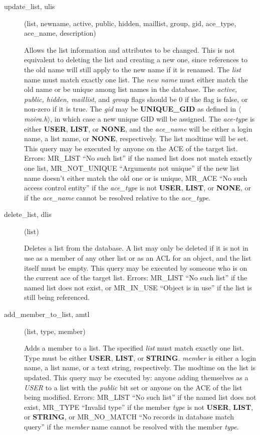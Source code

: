 \documentclass{article}
\begin{document}
\begin{description}
\item[update\_list, ulis](list, newname, active, public, hidden, maillist,
group, gid, ace\_type, ace\_name, description)

Allows the list information and attributes to be changed. This is not
equivalent to deleting the list and creating a new one, since
references to the old name will still apply to the new name if it is
renamed. The {\em list} name must match exactly one list. The {\em new
name} must either match the old name or be unique among list names in
the database. The {\em active, public, hidden, maillist}, and {\em
group} flags should be 0 if the flag is false, or non-zero if it is
true. The {\em gid} may be {\bf UNIQUE\_GID} as defined in {\em
$\langle$moira.h$\rangle$}, in which case a new unique GID will be
assigned. The {\em ace-type} is either {\bf USER}, {\bf LIST}, or {\bf
NONE}, and the {\em ace\_name} will be either a login name, a list
name, or {\bf NONE}, respectively. The list modtime will be set. This
query may be executed by anyone on the ACE of the target list. Errors:
MR\_LIST ``No such list'' if the named list does not match exactly one
list, MR\_NOT\_UNIQUE ``Arguments not unique'' if the new list name
doesn't either match the old one or is unique, MR\_ACE ``No such access
control entity'' if the {\em ace\_type} is not {\bf USER}, {\bf LIST},
or {\bf NONE}, or if the {\em ace\_name} cannot be resolved relative to
the {\em ace\_type}.

\item[delete\_list, dlis](list)

Deletes a list from the database.  A list may only be deleted if it is
not in use as a member of any other list or as an ACL for an object,
and the list itself must be empty.  This query may be executed by
someone who is on the current ace of the target list.  Errors:
MR\_LIST ``No such list'' if the named list does not exist, or
MR\_IN\_USE ``Object is in use'' if the list is still being referenced.

\item[add\_member\_to\_list, amtl](list, type, member)

Adds a member to a list.  The specified {\em list} must match exactly
one list.  Type must be either {\bf USER}, {\bf LIST}, or {\bf STRING}.
{\em member} is either a login name, a list name, or a text string,
respectively.  The modtime on the list is updated.  This query may
be executed by: anyone adding themselves as a {\em USER} to a list with the
{\em public} bit set or anyone on the ACE of the list being modified.
Errors: MR\_LIST ``No such list'' if the named list does not exist,
MR\_TYPE ``Invalid type'' if the member {\em type} is not {\bf USER}, {\bf LIST}, or
{\bf STRING}, or MR\_NO\_MATCH ``No records in database match query'' if the
{\em member} name cannot be resolved with the member {\em type}.


\end{description}
\end{document}
